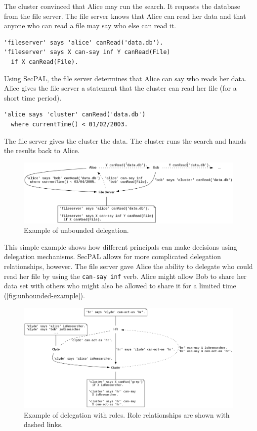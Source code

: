 \documentclass[thesis.tex]{subfiles}
\begin{document}
The cluster convinced that Alice may run the search.
It requests the database from the file server.  The file
server knows that Alice can read her data and that anyone who can read
a file may say who else can read it.
\begin{lstlisting}
'fileserver' says 'alice' canRead('data.db').
'fileserver' says X can-say inf Y canRead(File)
  if X canRead(File).
\end{lstlisting}
Using SecPAL, the file server determines that Alice can say who
reads her data.  Alice gives the file server a statement that
the cluster can read her file (for a short time
period).
\begin{lstlisting}
'alice says 'cluster' canRead('data.db')
  where currentTime() < 01/02/2003.
\end{lstlisting}
The file server gives the cluster the data.
The cluster runs the search and hands the results back to Alice.

\begin{figure}
  \centering
  \includegraphics[width=\textwidth]{figures/secpal-example-delegation.png}
  \caption{Example of unbounded delegation.}
  \label{fig:unbounded-example}
\end{figure}

This simple example shows how different principals can make decisions using delegation mechanisms.
SecPAL allows for more complicated delegation relationships, however. 
The file server gave Alice the ability to delegate who could read her file by using the \texttt{can-say inf} verb.
Alice might allow Bob to share her data set with others who might also be allowed to share it for a limited time (\autoref{fig:unbounded-example}).

\begin{figure}
  \centering
  \includegraphics[width=\textwidth]{figures/secpal-example-roles.png}
  \caption[Example of delegation with roles.]{Example of delegation with roles.  Role relationships are shown with dashed links.}
  \label{fig:roles-example}
\end{figure}
\end{document}
